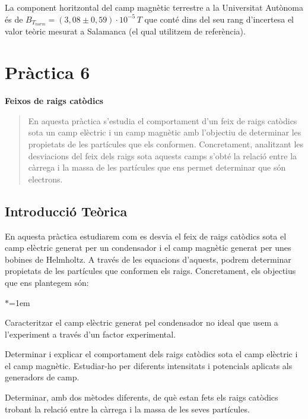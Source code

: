 \documentclass[11pt]{article}
\numberwithin{equation}{section}
\numberwithin{figure}{section}
\numberwithin{table}{section}
\begin{document}
La component horitzontal del camp magnètic terrestre a la Universitat Autònoma és de $B_{T_{norm}}= (3,08 \pm 0,59)\cdot10^{-5} \, T$ que conté dins del seu rang d’incertesa el valor teòric mesurat a Salamanca (el qual utilitzem de referència).

\newpage

\section{\huge \textbf{Pràctica 6}}  %

\vspace{.5em}  %

{\Huge \textbf{Feixos de raigs catòdics}}  %

\begin{abstract}
     En aquesta pràctica s'estudia el comportament d'un feix de raigs catòdics sota un camp elèctric i un camp magnètic amb l'objectiu de determinar les propietats de les partícules que els conformen. Concretament, analitzant les desviacions del feix dels raigs sota aquests camps s'obté la relació entre la càrrega i la massa de les partícules que ens permet determinar que són electrons.
\end{abstract}

\subsection{Introducció Teòrica}
En aquesta pràctica estudiarem com es desvia el feix de raigs catòdics sota el camp elèctric generat per un condensador i el camp magnètic generat per unes bobines de Helmholtz. A través de les equacions d'aquests, podrem determinar propietats de les partícules que conformen els raigs. Concretament, els objectius que ens plantegem són:

\begin{list}{$\ast$}{\leftmargin=1em}
    \item Caracteritzar el camp elèctric generat pel condensador no ideal que usem a l'experiment a través d'un factor experimental.
    \item Determinar i explicar el comportament dels raigs catòdics sota el camp elèctric i el camp magnètic. Estudiar-ho per diferents intensitats i potencials aplicats als generadors de camp.
    \item Determinar, amb dos mètodes diferents, de què estan fets els raigs catòdics trobant la relació entre la càrrega i la massa de les seves partícules.
\end{list}
\end{document}
